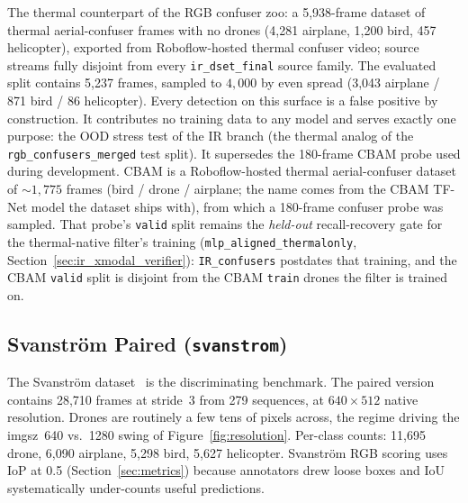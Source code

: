 The thermal counterpart of the RGB confuser zoo: a 5{,}938-frame dataset of thermal aerial-confuser frames with no drones (4{,}281 airplane, 1{,}200 bird, 457 helicopter), exported from Roboflow-hosted thermal confuser video; source streams fully disjoint from every \texttt{ir\_dset\_final} source family. The evaluated split contains 5{,}237 frames, sampled to $4{,}000$ by even spread (3{,}043 airplane / 871 bird / 86 helicopter). Every detection on this surface is a false positive by construction. It contributes no training data to any model and serves exactly one purpose: the OOD stress test of the IR branch (the thermal analog of the \texttt{rgb\_confusers\_merged} test split). It supersedes the 180-frame CBAM probe used during development. CBAM is a Roboflow-hosted thermal aerial-confuser dataset of ${\sim}1{,}775$ frames (bird / drone / airplane; the name comes from the CBAM TF-Net model the dataset ships with), from which a 180-frame confuser probe was sampled. That probe's \texttt{valid} split remains the \emph{held-out} recall-recovery gate for the thermal-native filter's training (\texttt{mlp\_aligned\_thermalonly}, Section~\ref{sec:ir_xmodal_verifier}): \texttt{IR\_confusers} postdates that training, and the CBAM \texttt{valid} split is disjoint from the CBAM \texttt{train} drones the filter is trained on.

\subsection{Svanstr\"om Paired (\texttt{svanstrom})}
\label{sec:ds_svanstrom}

The Svanstr\"om dataset~\cite{svanstrom2021real,svanstrom2022dronedataset} is the discriminating benchmark. The paired version contains 28{,}710 frames at stride~3 from 279 sequences, at $640{\times}512$ native resolution. Drones are routinely a few tens of pixels across, the regime driving the imgsz~640 vs.~1280 swing of Figure~\ref{fig:resolution}. Per-class counts: 11{,}695 drone, 6{,}090 airplane, 5{,}298 bird, 5{,}627 helicopter. Svanstr\"om RGB scoring uses IoP at 0.5 (Section~\ref{sec:metrics}) because annotators drew loose boxes and IoU systematically under-counts useful predictions.

